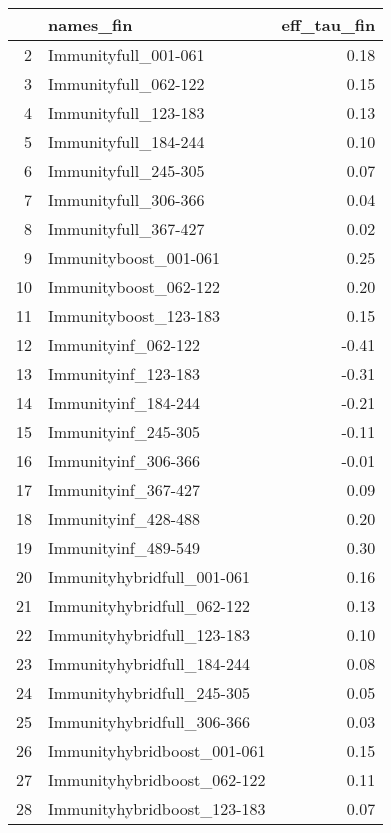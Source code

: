 \begin{table}[ht]
\centering
\begin{tabular}{rlr}
  \hline
 & names\_fin & eff\_tau\_fin \\ 
  \hline
2 & Immunityfull\_001-061 & 0.18 \\ 
  3 & Immunityfull\_062-122 & 0.15 \\ 
  4 & Immunityfull\_123-183 & 0.13 \\ 
  5 & Immunityfull\_184-244 & 0.10 \\ 
  6 & Immunityfull\_245-305 & 0.07 \\ 
  7 & Immunityfull\_306-366 & 0.04 \\ 
  8 & Immunityfull\_367-427 & 0.02 \\ 
  9 & Immunityboost\_001-061 & 0.25 \\ 
  10 & Immunityboost\_062-122 & 0.20 \\ 
  11 & Immunityboost\_123-183 & 0.15 \\ 
  12 & Immunityinf\_062-122 & -0.41 \\ 
  13 & Immunityinf\_123-183 & -0.31 \\ 
  14 & Immunityinf\_184-244 & -0.21 \\ 
  15 & Immunityinf\_245-305 & -0.11 \\ 
  16 & Immunityinf\_306-366 & -0.01 \\ 
  17 & Immunityinf\_367-427 & 0.09 \\ 
  18 & Immunityinf\_428-488 & 0.20 \\ 
  19 & Immunityinf\_489-549 & 0.30 \\ 
  20 & Immunityhybridfull\_001-061 & 0.16 \\ 
  21 & Immunityhybridfull\_062-122 & 0.13 \\ 
  22 & Immunityhybridfull\_123-183 & 0.10 \\ 
  23 & Immunityhybridfull\_184-244 & 0.08 \\ 
  24 & Immunityhybridfull\_245-305 & 0.05 \\ 
  25 & Immunityhybridfull\_306-366 & 0.03 \\ 
  26 & Immunityhybridboost\_001-061 & 0.15 \\ 
  27 & Immunityhybridboost\_062-122 & 0.11 \\ 
  28 & Immunityhybridboost\_123-183 & 0.07 \\ 
   \hline
\end{tabular}
\end{table}
